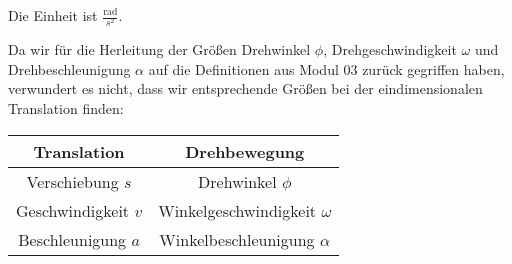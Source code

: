 \begin{MContent}
\begin{MInfo}
Die Einheit ist $\frac{\text{rad}}{s^2}$.
\end{MInfo}

Da wir f\"ur die Herleitung der Gr\"o{\ss}en Drehwinkel $\phi$, Drehgeschwindigkeit $\omega$ und Drehbeschleunigung $\alpha$ auf die Definitionen aus Modul 03 zur\"uck gegriffen haben, verwundert es nicht, dass wir entsprechende Gr\"o{\ss}en bei der eindimensionalen Translation finden:
\begin{center}
  \begin{tabular}{|c|c|} \hline
   
     Translation & Drehbewegung\\ \hline
     Verschiebung $                                                                                                                                                                                                                       s$ & Drehwinkel $\phi$ \\
     Geschwindigkeit $v$ & Winkelgeschwindigkeit $\omega$ \\
     Beschleunigung $a$ & Winkelbeschleunigung $\alpha$ \\
     \hline
  \end{tabular}
  \end{center}
  \end{MContent}
  
